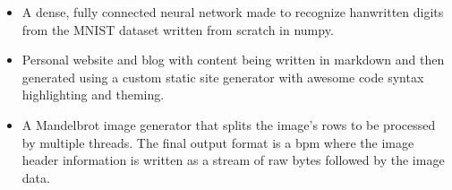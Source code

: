 \smallskip
{}
\begin{itemize}
	\item A dense, fully connected neural network made to recognize hanwritten
		digits from the MNIST dataset written from scratch in numpy.
\end{itemize}
\smallskip
{}
\begin{itemize}
	\item Personal website and blog with content being written in markdown and then generated using a
		custom static site generator with awesome code syntax highlighting and theming.
\end{itemize}
\smallskip
{}
\begin{itemize}
	\item A Mandelbrot image generator that splits the 
		image's rows to be processed by multiple threads. The final output format 
		is a bpm where the image header information is written as a stream of raw 
		bytes followed by the image data.
\end{itemize}
\smallskip

